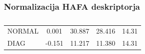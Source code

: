 \subsubsection{Normalizacija HAFA deskriptorja}

\begin{table}[htb]
	\centering
	\begin{tabular}{l S[table-format=1.3] S[table-format=2.3] S[table-format=2.3] S[table-format=2.2]}
		\toprule
		 &  &  &  & \\
		\midrule%
		NORMAL & 0.001 & 30.887 & 28.416 & 14.31 \\
		DIAG & -0.151 & 11.217 & 11.380 & 14.31 \\
		\bottomrule
	\end{tabular}
	\caption[]{}
	\label{tab:hafa-norm}
\end{table}


